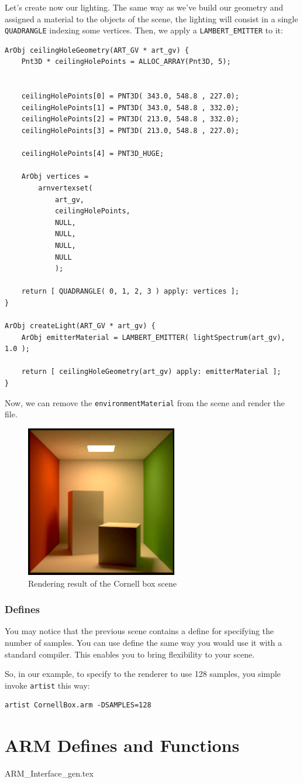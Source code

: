 \documentclass[a4paper,chapterprefix]{scrbook}
\begin{document}
Let's create now our lighting. The same way as we've build our geometry and assigned a material to the objects of the scene, the lighting will consist in a single \verb?QUADRANGLE? indexing some vertices. Then, we apply a \verb?LAMBERT_EMITTER? to it:

\begin{lstlisting}
ArObj ceilingHoleGeometry(ART_GV * art_gv) {
    Pnt3D * ceilingHolePoints = ALLOC_ARRAY(Pnt3D, 5);


    ceilingHolePoints[0] = PNT3D( 343.0, 548.8 , 227.0);
    ceilingHolePoints[1] = PNT3D( 343.0, 548.8 , 332.0);
    ceilingHolePoints[2] = PNT3D( 213.0, 548.8 , 332.0);
    ceilingHolePoints[3] = PNT3D( 213.0, 548.8 , 227.0);

    ceilingHolePoints[4] = PNT3D_HUGE;
    
    ArObj vertices =
        arnvertexset(
            art_gv,
            ceilingHolePoints,
            NULL,
            NULL,
            NULL,
            NULL
            );

    return [ QUADRANGLE( 0, 1, 2, 3 ) apply: vertices ];
}

ArObj createLight(ART_GV * art_gv) {
    ArObj emitterMaterial = LAMBERT_EMITTER( lightSpectrum(art_gv), 1.0 );

    return [ ceilingHoleGeometry(art_gv) apply: emitterMaterial ];
}
\end{lstlisting}

Now, we can remove the \verb?environmentMaterial? from the scene and render the file.



\begin{figure}[h]
	\centering
	\includegraphics[width=0.2\linewidth]{Example_Scene/CornellBox.png}
	\caption{Rendering result of the Cornell box scene}
\end{figure}

\section{Defines}
You may notice that the previous scene contains a define for specifying the number of samples. You can use define the same way you would use it with a standard compiler. This enables you to bring flexibility to your scene.

So, in our example, to specify to the renderer to use 128 samples, you simple invoke \verb?artist? this way:

\begin{verbatim}
artist CornellBox.arm -DSAMPLES=128
\end{verbatim}


\part{ARM Defines and Functions}
{ARM_Interface_gen.tex}
\end{document}

